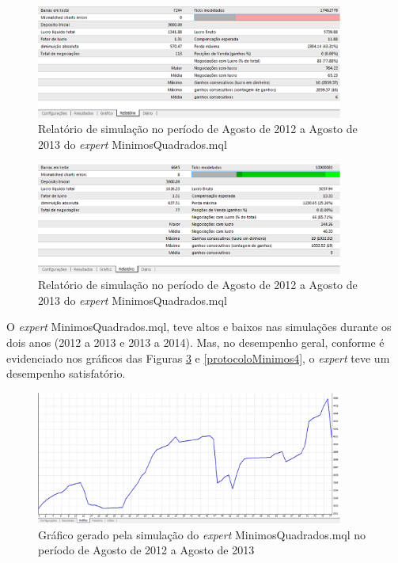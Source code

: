\begin{figure}[H]
\centering
\includegraphics[width=0.9\textwidth]{figuras/protocoloMinimos}
\caption{Relatório de simulação no período de Agosto de 2012 a Agosto de 2013 do \textit{expert} MinimosQuadrados.mql}
\label{protocoloMinimos}
\end{figure}

\begin{figure}[H]
\centering
\includegraphics[width=0.9\textwidth]{figuras/protocoloMinimos2}
\caption{Relatório de simulação no período de Agosto de 2012 a Agosto de 2013 do \textit{expert} MinimosQuadrados.mql}
\label{protocoloMinimos2}
\end{figure}

O \textit{expert} MinimosQuadrados.mql, teve altos e baixos nas simulações durante os dois anos (2012 a 2013 e 2013 a 2014). Mas, no desempenho geral, conforme é evidenciado nos gráficos das Figuras \ref{protocoloMinimos3} e \ref{protocoloMinimos4}, o \textit{expert} teve um desempenho satisfatório.

\begin{figure}[H]
\centering
\includegraphics[width=0.9\textwidth]{figuras/protocoloMinimos3}
\caption{Gráfico gerado pela simulação do \textit{expert} MinimosQuadrados.mql no período de Agosto de 2012 a Agosto de 2013}
\label{protocoloMinimos3}
\end{figure}

